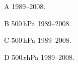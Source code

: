 \documentclass{article}
\begin{document}
A 1989--2008.

B {500{$\,$}hPa 1989--2008.}

C 500$\,$hPa 1989--2008.

D {500$x$hPa 1989--2008.}
\end{document}
